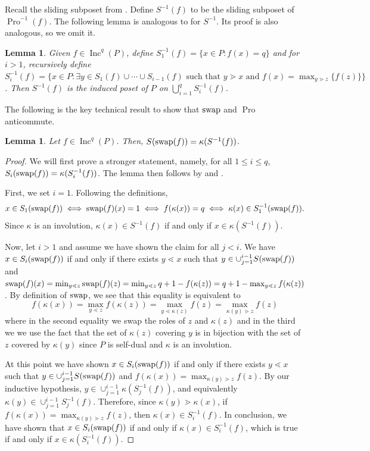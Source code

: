 \documentclass[11pt]{amsart}
\newtheorem{lemma}[theorem]{Lemma}
\theoremstyle{definition}
\DeclareMathOperator{\Inc}{\mathrm{Inc}}
\DeclareMathOperator{\Pro}{\mathrm{Pro}}
\newcommand{\swap}{\textnormal{swap}}
\begin{document}
Recall the sliding subposet from .
Define $S^{-1}(f)$ to be the sliding subposet of $\Pro^{-1}(f)$. 
The following lemma is analogous to  for $S^{-1}$. Its proof is also analogous, so we omit it.

\begin{lemma}\label{lem:AlternateDescriptionInverseSliding}
Given $f \in \Inc^q(P)$, define $S_1^{-1}(f) = \{x \in P: f(x) = q\}$ and for $i > 1$, recursively define $S_i^{-1}(f) = \{x \in P: \exists y \in S_1(f) \cup \cdots \cup S_{i-1}(f) \text{ such that } y \gtrdot x \text{ and } f(x) = \max_{y \gtrdot z}\{f(z)\}\}$. Then $S^{-1}(f)$ is the induced poset of $P$ on $\bigcup_{i=1}^q S_i^{-1}(f)$.
\end{lemma}

The following is the key technical result to show that $\swap$ and $\Pro$ anticommute.

\begin{lemma}\label{lem:SlidingAndSwap}
Let $f \in \Inc^q(P)$. Then, $S(\swap(f)) = \kappa(S^{-1}(f))$. 
\end{lemma}

\begin{proof}
We will first prove a stronger statement, namely, for all $1 \leq i \leq q$, $S_i(\swap(f)) = \kappa(S^{-1}_i(f))$. The lemma then follows by  and .


First, we set $i = 1$. Following the definitions, \[
x \in S_1(\swap(f)) \iff \swap(f)(x) = 1 \iff f(\kappa(x)) = q \iff \kappa(x) \in S_1^{-1}(\swap(f)). 
\]
Since $\kappa$ is an involution,  $\kappa(x) \in S^{-1}(f)$  if and only if $x \in \kappa(S^{-1}(f))$. 

Now, let $i > 1$ and assume we have shown the claim for all $j < i$. 
We have $x \in S_i(\swap(f))$ if and only if there exists $y \lessdot x$ such that $y \in \cup_{j =1}^{i-1} S(\swap(f))$ and $\swap(f)(x) = \min_{y \lessdot z} \swap(f)(z) = \min_{y \lessdot z} q+1 - f(\kappa(z)) = q+1 - \max_{y \lessdot z} f(\kappa(z))$.
By definition of $\swap$, we see that this equality is equivalent to \[
f(\kappa(x)) = \max_{y \lessdot z} f(\kappa(z)) = \max_{y \lessdot \kappa(z)} f(z) = \max_{\kappa(y) \gtrdot z}f(z)
\] where in the second equality we swap the roles of $z$ and $\kappa(z)$ and in the third we we use the fact that  the set of $\kappa(z)$ covering $y$ is in bijection with the set of $z$ covered by $\kappa(y)$ since $P$ is self-dual and $\kappa$ is an involution. 

At this point we have shown  $x \in S_i(\swap(f))$ if and only if there exists $y \lessdot x$ such that $y \in \cup_{j =1}^{i-1} S(\swap(f))$ and $f(\kappa(x)) = \max_{\kappa(y) \gtrdot z}f(z)$.
By our inductive hypothesis, $y \in \cup_{j=1}^{i-1} \kappa(S^{-1}_j(f))$, and equivalently $\kappa(y) \in \cup_{j=1}^{i-1} S^{-1}_j(f)$. Therefore, since $\kappa(y) \gtrdot \kappa(x)$, if $f(\kappa(x)) = \max_{\kappa(y) \gtrdot z}f(z)$, then $\kappa(x) \in S^{-1}_i(f)$. In conclusion, we have shown that $x \in S_i(\swap(f))$ if and only if $\kappa(x) \in S^{-1}_i(f)$, which is true if and only if $x \in \kappa(S^{-1}_i(f))$.
\end{proof}
\end{document}

